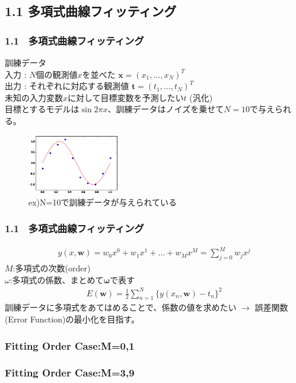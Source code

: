 \documentclass[dvipdfmx]{beamer}
\theoremstyle{definition}
\begin{document}
\subsection{1.1 多項式曲線フィッティング}
\begin{frame}
  \frametitle{1.1 \ 多項式曲線フィッティング}
  訓練データ \\
  入力 : $N$個の観測値$x$を並べた $\bm{x} = (x_1, \dots, x_N)^T$ \\
  出力 : それぞれに対応する観測値 $\bm{t} = (t_1, \dots, t_N)^T$ \\
 
  未知の入力変数$x$に対して目標変数を予測したい$t$ (汎化)\\
  
  目標とするモデルは$\sin{2 \pi x}$、訓練データはノイズを乗せて$N=10$で与えられる。
  \begin{figure}[htb]
    \centering
    \includegraphics[width=4.0cm,clip]{res/fitting.eps}
    \caption{ex)N=10で訓練データが与えられている}
  \end{figure}
  
\end{frame}

\begin{frame}
  \frametitle{1.1 \ 多項式曲線フィッティング}
  \begin{gather*}
    y(x,\bm{w}) = w_0 x^0 + w_1 x^1 + \dots + w_M x^{M} = \sum_{j=0}^{M} w_j x^j
  \end{gather*}
  $M$:多項式の次数(order) \\
  $\omega$:多項式の係数、まとめて$\bm{\omega}$で表す \\
  \begin{gather*}
    E(\bm{w}) = \frac{1}{2} \sum_{n=1}^{N} \{ y(x_n,\bm{w})- t_n \}^2
  \end{gather*}
  訓練データに多項式をあてはめることで、係数の値を求めたい $\to$ 誤差関数(Error Function)の最小化を目指す。
\end{frame}

\begin{frame}
  \frametitle{Fitting Order Case:M=0,1}
\end{frame}

\begin{frame}
  \frametitle{Fitting Order Case:M=3,9}
\end{frame}
\end{document}
